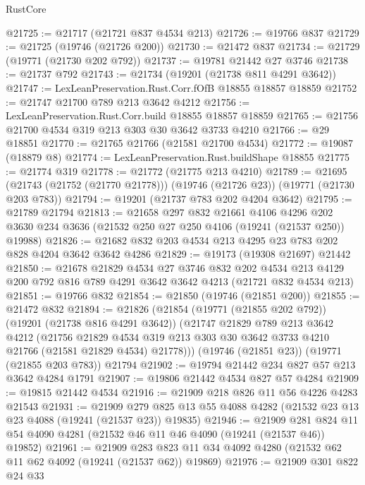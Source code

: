 \begin{lexlean}{RustCore}
\begin{coremodule}
@21725 := @21717 (@21721 @837 @4534 @213)
@21726 := @19766 @837
@21729 := @21725 (@19746 (@21726 @200))
@21730 := @21472 @837
@21734 := @21729 (@19771 (@21730 @202 @792))
@21737 := @19781 @21442 @27 @3746
@21738 := @21737 @792
@21743 := @21734 (@19201 (@21738 @811 @4291 @3642))
@21747 := LexLeanPreservation.Rust.Corr.fOfB @18855 @18857 @18859
@21752 := @21747 @21700 @789 @213 @3642 @4212
@21756 := LexLeanPreservation.Rust.Corr.build @18855 @18857 @18859
@21765 := @21756 @21700 @4534 @319 @213 @303 @30 @3642 @3733 @4210
@21766 := @29 @18851
@21770 := @21765 @21766 (@21581 @21700 @4534)
@21772 := @19087 (@18879 @8)
@21774 := LexLeanPreservation.Rust.buildShape @18855
@21775 := @21774 @319
@21778 := @21772 (@21775 @213 @4210)
@21789 := @21695 (@21743 (@21752 (@21770 @21778))) (@19746 (@21726 @23)) (@19771 (@21730 @203 @783))
@21794 := @19201 (@21737 @783 @202 @4204 @3642)
@21795 := @21789 @21794
@21813 := @21658
    @297
    @832
    @21661
    @4106
    @4296
    @202
    @3630
    @234
    @3636
    (@21532 @250 @27 @250 @4106 (@19241 (@21537 @250)) @19988)
@21826 := @21682 @832 @203 @4534 @213 @4295 @23 @783 @202 @828 @4204 @3642 @3642 @4286
@21829 := @19173 (@19308 @21697) @21442
@21850 := @21678
    @21829
    @4534
    @27
    @3746
    @832
    @202
    @4534
    @213
    @4129
    @200
    @792
    @816
    @789
    @4291
    @3642
    @3642
    @4213
    (@21721 @832 @4534 @213)
@21851 := @19766 @832
@21854 := @21850 (@19746 (@21851 @200))
@21855 := @21472 @832
@21894 := @21826
    (@21854
      (@19771 (@21855 @202 @792))
      (@19201 (@21738 @816 @4291 @3642))
      (@21747
        @21829
        @789
        @213
        @3642
        @4212
        (@21756
          @21829
          @4534
          @319
          @213
          @303
          @30
          @3642
          @3733
          @4210
          @21766
          (@21581 @21829 @4534)
          @21778)))
    (@19746 (@21851 @23))
    (@19771 (@21855 @203 @783))
    @21794
@21902 := @19794 @21442 @234 @827 @57 @213 @3642 @4284 @1791
@21907 := @19806 @21442 @4534 @827 @57 @4284
@21909 := @19815 @21442 @4534
@21916 := @21909 @218 @826 @11 @56 @4226 @4283 @21543
@21931 := @21909
    @279
    @825
    @13
    @55
    @4088
    @4282
    (@21532 @23 @13 @23 @4088 (@19241 (@21537 @23)) @19835)
@21946 := @21909
    @281
    @824
    @11
    @54
    @4090
    @4281
    (@21532 @46 @11 @46 @4090 (@19241 (@21537 @46)) @19852)
@21961 := @21909
    @283
    @823
    @11
    @34
    @4092
    @4280
    (@21532 @62 @11 @62 @4092 (@19241 (@21537 @62)) @19869)
@21976 := @21909
    @301
    @822
    @24
    @33

\end{coremodule}
\end{lexlean}
